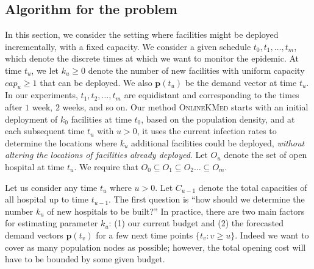 

\subsection*{Algorithm for the \probinc{} problem}
In this section, we consider the setting where facilities might be deployed incrementally, with a fixed capacity. We consider a given schedule $t_0, t_1, \ldots, t_m$, which denote the discrete times at which we want to monitor the epidemic. At time $t_u$, we let $k_u \geq 0$ denote the number of new facilities with uniform capacity $cap_u \geq 1$ that can be deployed. We also $\mathbf{p}(t_u)$ be the demand vector at time $t_u$. In our experiments, $t_1, t_2, \ldots, t_m$ are equidistant and corresponding to the times after $1$ week, $2$ weeks, and so on. Our method \textsc{OnlineKMed} starts with an initial
deployment of $k_0$ facilities at time $t_0$, based on the population density, and at each subsequent time $t_u$ with $u > 0$, it uses the current infection rates to determine the locations where $k_u$ additional facilities could be deployed, \emph{without altering the locations of facilities already deployed}. Let $O_u$ denote the set of open hospital at time $t_u$. We require that $O_0 \subseteq O_1 \subseteq O_2 \ldots \subseteq O_m$.

Let us consider any time $t_u$ where $u > 0$. Let $C_{u-1}$ denote the total capacities of all hospital up to time $t_{u-1}$. The first question is ``how should we determine the number $k_u$ of new hospitals to be built?'' In practice, there are two main factors for estimating parameter $k_u$: (1) our current budget and (2) the forecasted demand vectors $\mathbf{p}(t_v)$ for a few next time points $\{t_v: v \geq u\}$. Indeed we want to cover as many population nodes as possible; however, the total opening cost will have to be bounded by some given budget.

